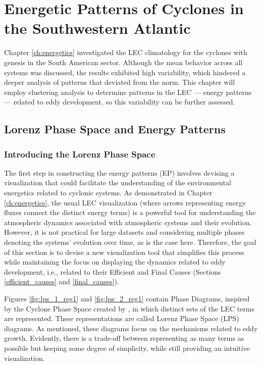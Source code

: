 \chapter{Energetic Patterns of Cyclones in the Southwestern Atlantic}\label{ch:energetic_patterns}


Chapter \ref{ch:energetics} investigated the LEC climatology for the cyclones with genesis in the South American sector. Although the mean behavior across all systems was discussed, the results exhibited high variability, which hindered a deeper analysis of patterns that deviated from the norm. This chapter will employ clustering analysis to determine patterns in the LEC — energy patterns — related to eddy development, so this variability can be further assessed. 

\section{Lorenz Phase Space and Energy Patterns}\label{sec:lps}

\subsection{Introducing the Lorenz Phase Space}

The first step in constructing the energy patterns (EP) involves devising a visualization that could facilitate the understanding of the environmental energetics related to cyclonic systems. As demonstrated in Chapter \ref{ch:energetics}, the usual LEC visualization (where arrows representing energy fluxes connect the distinct energy terms) is a powerful tool for understanding the atmospheric dynamics associated with atmospheric systems and their evolution. However, it is not practical for large datasets and considering multiple phases denoting the systems' evolution over time, as is the case here. Therefore, the goal of this section is to devise a new visualization tool that simplifies this process while maintaining the focus on displaying the dynamics related to eddy development, i.e., related to their Efficient and Final Causes (Sections \ref{efficient_causes} and \ref{final_causes}).

Figures \ref{fig:lps_1_reg1} and \ref{fig:lps_2_reg1} contain Phase Diagrams, inspired by the Cyclone Phase Space created by \citet{hart2003cyclone}, in which distinct sets of the LEC terms are represented. These representations are called Lorenz Phase Space (LPS) diagrams. As mentioned, these diagrams focus on the mechanisms related to eddy growth. Evidently, there is a trade-off between representing as many terms as possible but keeping some degree of simplicity, while still providing an intuitive visualization.

